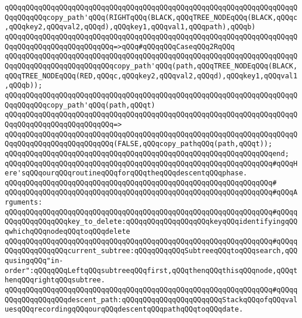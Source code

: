 \verb|qQQqqQQqqQQqqQQqqQQqqQQqqQQqqQQqqQQqqQQqqQQqqQQqqQQqqQQqqQQqqQQqqQQqqQQqqQQqqQQqcopy_path'qQQq(RIGHTqQQq(BLACK,qQQqTREE_NODEqQQq(BLACK,qQQqc,qQQqkey2,qQQqval2,qQQqd),qQQqkey1,qQQqval1,qQQqpath),qQQqb)|\newline
\verb|qQQqqQQqqQQqqQQqqQQqqQQqqQQqqQQqqQQqqQQqqQQqqQQqqQQqqQQqqQQqqQQqqQQqqQQqqQQqqQQqqQQqqQQqqQQqqQQq=>qQQq#qQQqqQQqCaseqQQq2RqQQq|\newline
\verb|qQQqqQQqqQQqqQQqqQQqqQQqqQQqqQQqqQQqqQQqqQQqqQQqqQQqqQQqqQQqqQQqqQQqqQQqqQQqqQQqqQQqqQQqqQQqqQQqcopy_path'qQQq(path,qQQqTREE_NODEqQQq(BLACK,qQQqTREE_NODEqQQq(RED,qQQqc,qQQqkey2,qQQqval2,qQQqd),qQQqkey1,qQQqval1,qQQqb));|\newline
\newline
\verb|qQQqqQQqqQQqqQQqqQQqqQQqqQQqqQQqqQQqqQQqqQQqqQQqqQQqqQQqqQQqqQQqqQQqqQQqqQQqqQQqcopy_path'qQQq(path,qQQqt)|\newline
\verb|qQQqqQQqqQQqqQQqqQQqqQQqqQQqqQQqqQQqqQQqqQQqqQQqqQQqqQQqqQQqqQQqqQQqqQQqqQQqqQQqqQQqqQQqqQQqqQQq=>|\newline
\verb|qQQqqQQqqQQqqQQqqQQqqQQqqQQqqQQqqQQqqQQqqQQqqQQqqQQqqQQqqQQqqQQqqQQqqQQqqQQqqQQqqQQqqQQqqQQqqQQq(FALSE,qQQqcopy_pathqQQq(path,qQQqt));|\newline
\verb|qQQqqQQqqQQqqQQqqQQqqQQqqQQqqQQqqQQqqQQqqQQqqQQqqQQqqQQqqQQqqQQqend;|\newline
\newline
\verb|qQQqqQQqqQQqqQQqqQQqqQQqqQQqqQQqqQQqqQQqqQQqqQQqqQQqqQQqqQQqqQQq#qQQqHere'sqQQqourqQQqroutineqQQqforqQQqtheqQQqdescentqQQqphase.|\newline
\verb|qQQqqQQqqQQqqQQqqQQqqQQqqQQqqQQqqQQqqQQqqQQqqQQqqQQqqQQqqQQqqQQq#|\newline
\verb|qQQqqQQqqQQqqQQqqQQqqQQqqQQqqQQqqQQqqQQqqQQqqQQqqQQqqQQqqQQqqQQq#qQQqArguments:|\newline
\verb|qQQqqQQqqQQqqQQqqQQqqQQqqQQqqQQqqQQqqQQqqQQqqQQqqQQqqQQqqQQqqQQq#qQQqqQQqqQQqqQQqqQQqkey_to_delete:qQQqqQQqqQQqqQQqqQQqkeyqQQqidentifyingqQQqwhichqQQqnodeqQQqtoqQQqdelete|\newline
\verb|qQQqqQQqqQQqqQQqqQQqqQQqqQQqqQQqqQQqqQQqqQQqqQQqqQQqqQQqqQQqqQQq#qQQqqQQqqQQqqQQqqQQqcurrent_subtree:qQQqqQQqqQQqSubtreeqQQqtoqQQqsearch,qQQqusingqQQq"in-order":qQQqqQQqLeftqQQqsubtreeqQQqfirst,qQQqthenqQQqthisqQQqnode,qQQqthenqQQqrightqQQqsubtree.|\newline
\verb|qQQqqQQqqQQqqQQqqQQqqQQqqQQqqQQqqQQqqQQqqQQqqQQqqQQqqQQqqQQqqQQq#qQQqqQQqqQQqqQQqqQQqdescent_path:qQQqqQQqqQQqqQQqqQQqqQQqStackqQQqofqQQqvaluesqQQqrecordingqQQqourqQQqdescentqQQqpathqQQqtoqQQqdate.|\newline
